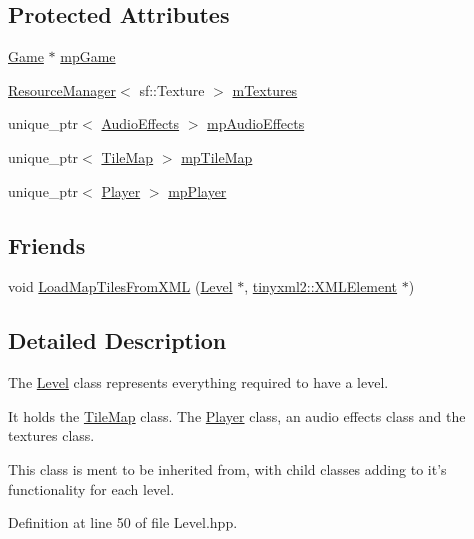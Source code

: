 \subsection*{Protected Attributes}
\begin{DoxyCompactItemize}
\item 
\hyperlink{class_game}{Game} $\ast$ \hyperlink{class_level_a21c456b270db451d1da365d37e365b32}{mp\-Game}
\item 
\hyperlink{class_resource_manager}{Resource\-Manager}$<$ sf\-::\-Texture $>$ \hyperlink{class_level_a17bf54432fa53317ab5d7ffffbfdec6f}{m\-Textures}
\item 
unique\-\_\-ptr$<$ \hyperlink{class_audio_effects}{Audio\-Effects} $>$ \hyperlink{class_level_ad7ed6a1f41d6557b9ca3f7e62d705eb2}{mp\-Audio\-Effects}
\item 
unique\-\_\-ptr$<$ \hyperlink{class_tile_map}{Tile\-Map} $>$ \hyperlink{class_level_a2294842a4de2c0fbe9b28a670088b5c4}{mp\-Tile\-Map}
\item 
unique\-\_\-ptr$<$ \hyperlink{class_player}{Player} $>$ \hyperlink{class_level_a1cb20848f0e9d49a6469b4682e105d94}{mp\-Player}
\end{DoxyCompactItemize}
\subsection*{Friends}
\begin{DoxyCompactItemize}
\item 
void \hyperlink{class_level_ac44de73f21a1e6e5ae31d28a411395da}{Load\-Map\-Tiles\-From\-X\-M\-L} (\hyperlink{class_level}{Level} $\ast$, \hyperlink{classtinyxml2_1_1_x_m_l_element}{tinyxml2\-::\-X\-M\-L\-Element} $\ast$)
\end{DoxyCompactItemize}


\subsection{Detailed Description}
The \hyperlink{class_level}{Level} class represents everything required to have a level. 

It holds the \hyperlink{class_tile_map}{Tile\-Map} class. The \hyperlink{class_player}{Player} class, an audio effects class and the textures class.

This class is ment to be inherited from, with child classes adding to it's functionality for each level. 

Definition at line 50 of file Level.\-hpp.



